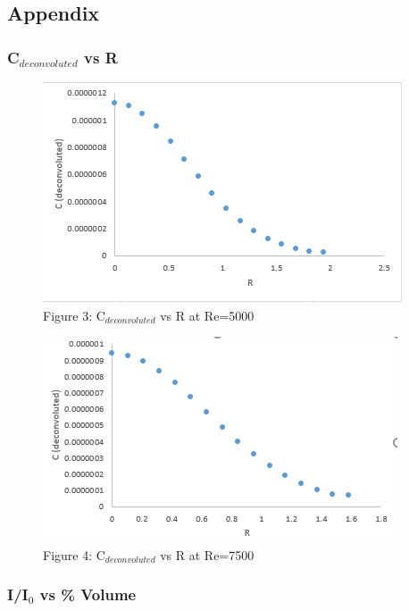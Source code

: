 \documentclass{article}
\begin{document}
\begin{center}
    \section*{Appendix}
\end{center}

\begin{center}
    \subsubsection*{C$_{deconvoluted}$ vs R}
\end{center}
\begin{figure}[h]
    \centering
    \includegraphics[width=.7\textwidth]{Lab1_CvsR_5000.png}
    \caption*{\footnotesize{Figure 3: C$_{deconvoluted}$ vs R at Re=5000}}
\end{figure}
\begin{figure}[h]
    \centering
    \includegraphics[width=.7\textwidth]{Lab1_CvsR_7500.png}
    \caption*{\footnotesize{Figure 4: C$_{deconvoluted}$ vs R at Re=7500}}
\end{figure}
\newpage
\begin{center}
    \subsubsection*{I/I$_0$ vs \% Volume}
\end{center}
\end{document}
